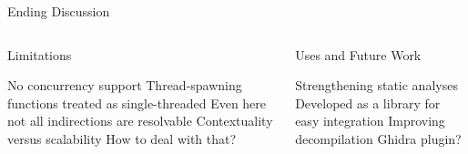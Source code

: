 \begin{frame}{Ending Discussion}
  \begin{columns}
    \begin{block}{Limitations}
      \begin{outline}
        \1 No concurrency support
        \2 Thread-spawning functions treated as single-threaded
        \1 Even here not all indirections are resolvable
        \2 Contextuality versus scalability
        \2 How to deal with that?
      \end{outline}
    \end{block}
    \pause
    \begin{block}{Uses and Future Work}
      \begin{outline}
        \1 Strengthening static analyses
        \2 Developed as a library for easy integration
        \1 Improving decompilation
        \2 Ghidra plugin?
      \end{outline}
    \end{block}
  \end{columns}
\end{frame}
